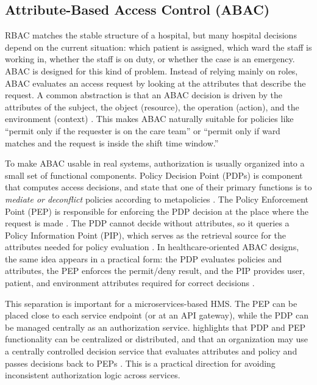 \subsection{Attribute-Based Access Control (ABAC)}
\label{subsec:abac}

RBAC matches the stable structure of a hospital, but many hospital decisions depend on the current situation: which patient is assigned, which ward the staff is working in, whether the staff is on duty, or whether the case is an emergency. ABAC is designed for this kind of problem. Instead of relying mainly on roles, ABAC evaluates an access request by looking at the attributes that describe the request. A common abstraction is that an ABAC decision is driven by the attributes of the subject, the object (resource), the operation (action), and the environment (context) \cite{Zheng2019ABAC}. This makes ABAC naturally suitable for policies like “permit only if the requester is on the care team” or “permit only if ward matches and the request is inside the shift time window.”
\vspace{0.5cm}


To make ABAC usable in real systems, authorization is usually organized into a small set of functional components. Policy Decision Point (PDPs) is component that computes access decisions, and state that one of their primary functions is to \emph{mediate or deconflict} policies  according to metapolicies \cite{NIST800162}. The Policy Enforcement Point (PEP) is responsible for enforcing the PDP decision at the place where the request is made \cite{NIST800162}. The PDP cannot decide without attributes, so it queries a Policy Information Point (PIP), which serves as the retrieval source for the attributes needed for policy evaluation \cite{NIST800162}. In healthcare-oriented ABAC designs, the same idea appears in a practical form: the PDP evaluates policies and attributes, the PEP enforces the permit/deny result, and the PIP provides user, patient, and environment attributes required for correct decisions \cite{Afshar2017ABAC}.

This separation is important for a microservices-based HMS. The PEP can be placed close to each service endpoint (or at an API gateway), while the PDP can be managed centrally as an authorization service. \cite{NIST800162} highlights that PDP and PEP functionality can be centralized or distributed, and that an organization may use a centrally controlled decision service that evaluates attributes and policy and passes decisions back to PEPs \cite{NIST800162}. This is a practical direction for avoiding inconsistent authorization logic across services.


